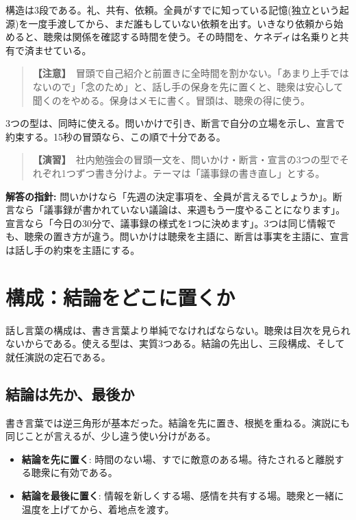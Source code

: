 \documentclass{article}
\begin{document}
構造は3段である。礼、共有、依頼。全員がすでに知っている記憶(独立という起源)を一度手渡してから、まだ誰もしていない依頼を出す。いきなり依頼から始めると、聴衆は関係を確認する時間を使う。その時間を、ケネディは名乗りと共有で済ませている。

\begin{quote}
\textbf{【注意】}\ 冒頭で自己紹介と前置きに全時間を割かない。「あまり上手ではないので」「念のため」と、話し手の保身を先に置くと、聴衆は安心して聞くのをやめる。保身はメモに書く。冒頭は、聴衆の得に使う。
\end{quote}

3つの型は、同時に使える。問いかけで引き、断言で自分の立場を示し、宣言で約束する。15秒の冒頭なら、この順で十分である。

\begin{quote}
\textbf{【演習】}\ 社内勉強会の冒頭一文を、問いかけ・断言・宣言の3つの型でそれぞれ1つずつ書き分けよ。テーマは「議事録の書き直し」とする。
\end{quote}

\textbf{解答の指針:} 問いかけなら「先週の決定事項を、全員が言えるでしょうか」。断言なら「議事録が書かれていない議論は、来週もう一度やることになります」。宣言なら「今日の30分で、議事録の様式を1つに決めます」。3つは同じ情報でも、聴衆の置き方が違う。問いかけは聴衆を主語に、断言は事実を主語に、宣言は話し手の約束を主語にする。

\section{構成：結論をどこに置くか}

話し言葉の構成は、書き言葉より単純でなければならない。聴衆は目次を見られないからである。使える型は、実質3つある。結論の先出し、三段構成、そして就任演説の定石である。

\subsection{結論は先か、最後か}

書き言葉では逆三角形が基本だった。結論を先に置き、根拠を重ねる。演説にも同じことが言えるが、少し違う使い分けがある。

\begin{itemize}
\item \textbf{結論を先に置く}: 時間のない場、すでに敵意のある場。待たされると離脱する聴衆に有効である。
\item \textbf{結論を最後に置く}: 情報を新しくする場、感情を共有する場。聴衆と一緒に温度を上げてから、着地点を渡す。
\end{itemize}
\end{document}
